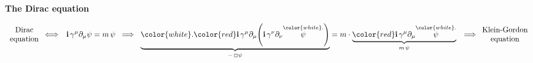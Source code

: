 \begin{frame}{\headingColor\bf\LARGE The Dirac equation}
\begin{itemize}
\begin{equation*}
	\begin{array}{c}\textnormal{Dirac} \\ \textnormal{equation} \end{array}
	\Longleftrightarrow\;\;\,
	\i\,\gamma^{\mu}\partial_{\mu}\psi = m\,\psi
	\;\;\Longrightarrow\;\;
	\underset{-\,\Box\psi}{\underbrace{{\color{white}.}{\color{red}\i\,\gamma^{\mu}\partial_{\mu}}\!\left(
		\i\,\gamma^{\nu}\partial_{\nu}\overset{{\color{white}.}}{\psi}
		\right)}}
		= m\cdot\underset{m\,\psi}{\underbrace{{\color{red}\i\,\gamma^{\mu}\partial_{\mu}}\overset{{\color{white}.}}{\psi}}}
	\;\;\,\Longrightarrow
	\begin{array}{c}\textnormal{Klein-Gordon} \\ \textnormal{equation} \end{array}
	\end{equation*}
\end{itemize}

\end{frame}
\normalsize

